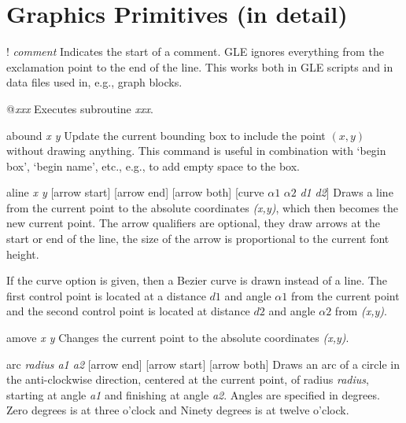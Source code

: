 \section{Graphics Primitives (in detail)}
\begin{commanddescription}

\item[{\sf ! {\it comment}}]
Indicates the start of a comment. GLE ignores everything from the exclamation point to the end of the line. This works both in GLE scripts and in data files used in, e.g., graph blocks.

\item[{\sf @{\it xxx}}] Executes subroutine {\it xxx}.

\item[{\sf abound {\it x y}}]
Update the current bounding box to include the point $(x,y)$ without drawing anything. This command is useful in combination with `begin box', `begin name', etc., e.g., to add empty space to the box.

\item[{\sf aline {\it x y}  [arrow start]  [arrow end] [arrow both]  [curve {\it $\alpha1$} {\it $\alpha2$} {\it d1} {\it d2}]}]
  Draws a line from
the current point to the absolute coordinates
{\it (x,y)}, which then becomes the new current point.  The arrow qualifiers
are optional, they draw arrows at the start or end of the line,  the size of
the arrow is proportional to the current font height.

If the curve option is given, then a Bezier curve is drawn instead of a line. The first control point is located at a distance $d1$ and angle $\alpha1$ from the current point and the second control point is located at distance $d2$ and angle $\alpha2$ from {\it (x,y)}.

\item[{\sf amove {\it x y}}]
 Changes the current point to the absolute coordinates
{\it (x,y)}.

\item[{\sf arc {\it radius a1 a2} [arrow end] [arrow start] [arrow both]}]
 Draws an arc of a circle in the anti-clockwise direction, centered
at the current point, of radius {\it radius},
starting at angle {\it a1} and finishing at angle {\it a2}. Angles
are specified in degrees.  Zero degrees is at three o'clock and Ninety
degrees is at twelve o'clock.


\end{commanddescription}
